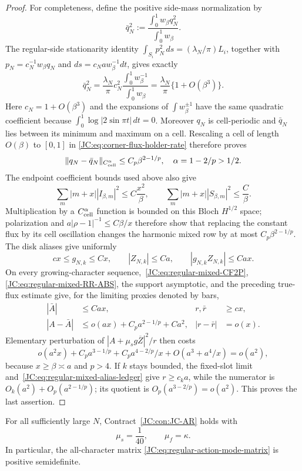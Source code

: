 \begin{proof}
For completeness, define the positive side-mass normalization by
\[
 \bar q_N^2:=
 \frac{\int_0^1w_\beta q_N^2}{\int_0^1w_\beta}.
\]
The regular-side stationarity identity
$\int_{S_i}p_N^2\,ds=(\lambda_N/\pi)L_i$, together with
$p_N=c_N^{-1}w_\beta q_N$ and
$ds=c_Na w_\beta^{-1}dt$, gives exactly
\[
 \bar q_N^2=\frac{\lambda_N}{\pi}c_N^2
 \frac{\int_0^1w_\beta^{-1}}{\int_0^1w_\beta}
 =\frac{\lambda_N}{\pi}\{1+O(\beta^3)\}.
\]
Here $c_N=1+O(\beta^3)$ and the expansions of
$\int w_\beta^{\pm1}$ have the same quadratic coefficient because
$\int_0^1\log|2\sin\pi t|\,dt=0$.  Moreover $q_N$ is cell-periodic and
$\bar q_N$ lies between its minimum and maximum on a cell.  Rescaling a
cell of length $O(\beta)$ to $[0,1]$ in
\eqref{JC:eq:corner-flux-holder-rate} therefore proves
\[
 \|q_N-\bar q_N\|_{C^\alpha_{\rm cell}}
 \le C_p\beta^{2-1/p},\quad \alpha=1-2/p>1/2.
\]
The endpoint coefficient bounds used above also give
\[
 \sum_m|m+x||I_{\beta,m}|^2\le C\frac{x^2}{\beta},\qquad
 \sum_m|m+x||S_{\beta,m}|^2\le\frac C\beta.
\]
Multiplication by a $C^\alpha_{\rm cell}$ function is bounded on this
Bloch $H^{1/2}$ space; polarization and
$a|\rho-1|^{-1}\le C\beta/x$ therefore show that replacing the constant
flux by its cell oscillation changes the harmonic mixed row by at most
$C_p\beta^{2-1/p}$.  The disk aliases give
uniformly
\begin{equation}\label{JC:eq:regular-mixed-alias-ledger}
 cx\le g_{N,k}\le Cx,\qquad |Z_{N,k}|\le Ca,\qquad
 |g_{N,k}Z_{N,k}|\le Cax.
\end{equation}
On every growing-character sequence,~\eqref{JC:eq:regular-mixed-CF2P},
\eqref{JC:eq:regular-mixed-RR-ABS}, the support asymptotic, and the preceding
true-flux estimate give, for the limiting proxies denoted by bars,
\begin{align*}
 |\bar A|&\le Cax,& r,\bar r&\ge cx,\\
 |A-\bar A|&\le o(ax)+C_pa^{2-1/p}+Ca^2,&
 |r-\bar r|&=o(x).
\end{align*}
Elementary perturbation of $|A+\mu_sg\overline Z|^2/r$ then costs
\[
 o(a^2x)+C_pa^{3-1/p}+C_pa^{4-2/p}/x+O(a^3+a^4/x)=o(a^2),
\]
because $x\ge\beta\asymp a$ and $p>4$.  If $k$ stays bounded, the
fixed-slot limit and~\eqref{JC:eq:regular-mixed-alias-ledger} give
$r\ge c_ka$, while the numerator is
$O_k(a^2)+O_p(a^{2-1/p})$; its quotient is
$O_p(a^{3-2/p})=o(a^2)$.  This proves the last assertion.
\end{proof}

\begin{proposition}
\label{JC:prop:regular-action-Schur-closed}
For all sufficiently large $N$, Contract~\ref{JC:con:JC-AR} holds with
\begin{equation}\label{JC:eq:regular-action-closed-constants}
 \boxed{\mu_s=\frac1{40},\qquad \mu_f=\kappa.}
\end{equation}
In particular, the all-character matrix
\eqref{JC:eq:regular-action-mode-matrix} is positive semidefinite.
\end{proposition}

